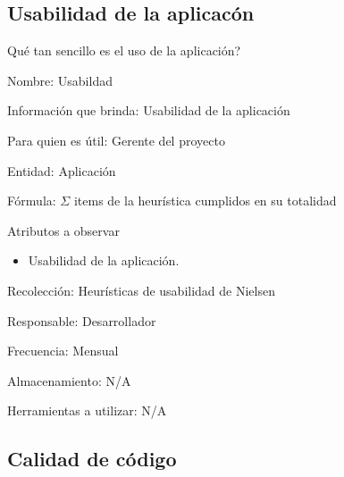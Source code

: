 \subsection{Usabilidad de la aplicacón}

 {
    \pregunta Qué tan sencillo es el uso de la aplicación?
} {
     {
        \item Nombre: Usabildad
        \item Información que brinda: Usabilidad de la aplicación
        \item Para quien es útil: Gerente del proyecto
        \item Entidad: Aplicación
        \item Fórmula: $\Sigma$ items de la heurística cumplidos en su totalidad
        \item Atributos a observar
            \begin{itemize}
                \item Usabilidad de la aplicación.
            \end{itemize}
        \item Recolección: Heurísticas de usabilidad de Nielsen
        \item Responsable: Desarrollador
        \item Frecuencia: Mensual
        \item Almacenamiento: N/A
        \item Herramientas a utilizar: N/A
    }
}

\subsection{Calidad de código}

